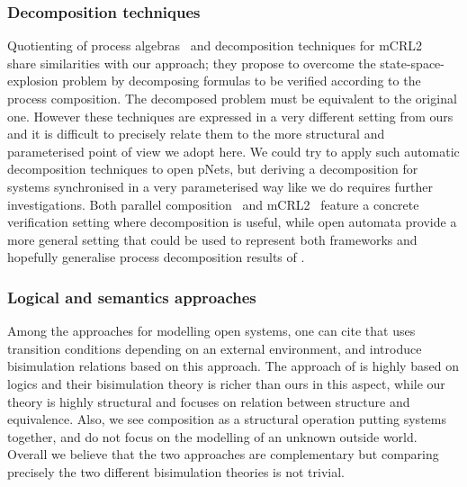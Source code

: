 \documentclass{elsarticle}
\begin{document}
\subsubsection*{Decomposition techniques}

Quotienting of process algebras~\cite{Larsen:91} and decomposition techniques for mCRL2~\cite{LaveauxWillemse:ICE21} share similarities with our approach; they propose to 
overcome the state-space-explosion problem by decomposing formulas to be verified according to the process composition. The decomposed problem must be equivalent to the original one.
However these techniques are expressed in a very different setting from ours and it is difficult to precisely relate them to the more structural and parameterised point of view we adopt here.
We could try to apply such automatic decomposition techniques to open pNets, but deriving a decomposition  for systems synchronised in a very parameterised way like we do requires further investigations.
Both parallel composition~\cite{Larsen:91} and mCRL2~\cite{LaveauxWillemse:ICE21} feature a concrete verification setting where decomposition is useful, while open automata provide a more general setting that could be used to represent both frameworks and hopefully generalise process decomposition results of \cite{Larsen:91,LaveauxWillemse:ICE21}.

\subsubsection*{Logical and semantics approaches}

Among the approaches for modelling open systems, one can cite  \cite{Beohar:2020} that uses transition conditions depending on an external environment, and introduce bisimulation relations based on this approach. The approach of  \cite{Beohar:2020} is  highly based on logics and their bisimulation theory is richer than ours in this aspect, while our theory is highly structural and focuses on relation between structure and equivalence. Also, we see composition as a structural operation putting systems together, and do not focus on the modelling of an unknown outside world. Overall we believe that the two approaches are complementary but comparing precisely the two different bisimulation theories is not  trivial.

\end{document}
